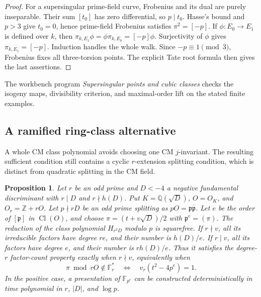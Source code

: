 \documentclass[11pt]{article}
\newtheorem{proposition}[theorem]{Proposition}
\theoremstyle{definition}
\theoremstyle{remark}
\begin{document}
\begin{proof}
For a supersingular prime-field curve, Frobenius and its
dual are purely inseparable.  Their sum $[t_0]$ has zero
differential, so $p\mid t_0$.  Hasse's bound and $p>3$
give $t_0=0$, hence prime-field Frobenius satisfies
$\pi^2=[-p]$.  If $\phi:E_0\to E_1$ is defined over $k$,
then $\pi_{k,E_1}\phi=\phi\pi_{k,E_0}=[-p]\phi$.
Surjectivity of $\phi$ gives $\pi_{k,E_1}=[-p]$.
Induction handles the whole walk.  Since $-p\equiv1\pmod3$,
Frobenius fixes all three-torsion points.  The explicit Tate
root formula then gives the last assertions.
\end{proof}

The workbench program \emph{Supersingular points and cubic classes} checks the isogeny maps, divisibility criterion, and maximal-order lift on the stated finite examples.

\subsection{A ramified ring-class alternative}

A whole CM class polynomial avoids choosing one CM $j$-invariant.
The resulting sufficient condition still contains a cyclic
$r$-extension splitting condition, which is distinct from quadratic
splitting in the CM field.

\begin{proposition}\label{prop:cm-ring-class-gate}
Let $r$ be an odd prime and $D<-4$ a negative fundamental
discriminant with $r\mid D$ and $r\nmid h(D)$.
Put $K=\mathbb Q(\sqrt D)$, $O=O_K$, and $O_r=\mathbb Z+rO$.
Let $p\nmid rD$ be an odd prime splitting as
$pO=\mathfrak p\overline{\mathfrak p}$.
Let $e$ be the order of $[\mathfrak p]$ in $\operatorname{Cl}(O)$,
and choose $\pi=(t+v\sqrt D)/2$ with
$\mathfrak p^e=(\pi)$.
The reduction of the class polynomial $H_{r^2D}$ modulo $p$ is
squarefree.  If $r\nmid v$, all its irreducible factors have degree
$re$, and their number is $h(D)/e$.
If $r\mid v$, all its factors have degree $e$, and their number is
$r h(D)/e$.
Thus it satisfies the degree-$r$ factor-count property exactly
when $r\nmid v$, equivalently when
\[
 \pi\bmod rO\notin\mathbb F_r^*
 \quad\Longleftrightarrow\quad
 v_r(t^2-4p^e)=1.
\]
In the positive case, a presentation of $\mathbb F_{p^r}$ can be
constructed deterministically in time polynomial in $r$, $|D|$,
and $\log p$.
\end{proposition}
\end{document}
